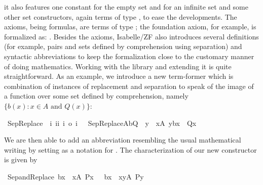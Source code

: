 it also features one constant 
for the empty set and  for an infinite set and some other
set constructors, again terms of type , to ease the
developments. The axioms, being formulas, are terms of type ;
the foundation axiom, for example, is formalized as:
. Besides the axioms, Isabelle/ZF also
introduces several definitions (for example, pairs and sets defined by
comprehension using separation) and syntactic abbreviations to keep
the formalization close to the customary manner of doing mathematics.
Working with the library and extending it is quite
straightforward. 
As an example, we introduce  a new term-former which is combination of
instances of replacement and separation to speak of the image of a function over some set
defined by comprehension, namely $\{b(x): x\in A\text{ and }Q(x)\}$:
\begin{isabelle}
  \isamarkupfalse%
  \ SepReplace\ {\isacharcolon}{\isacharcolon}\
  {\isachardoublequoteopen}{\isacharbrackleft}i{\isacharcomma}\
  i{\isasymRightarrow}i{\isacharcomma}\ i{\isasymRightarrow}\
  o{\isacharbrackright}\
  {\isasymRightarrow}i{\isachardoublequoteclose}\
  \isanewline \ \
  {\isachardoublequoteopen}SepReplace{\isacharparenleft}A{\isacharcomma}b{\isacharcomma}Q{\isacharparenright}\
  {\isacharequal}{\isacharequal}\ {\isacharbraceleft}y\ {\isachardot}\
  x{\isasymin}A{\isacharcomma}\
  y{\isacharequal}b{\isacharparenleft}x{\isacharparenright}\
  {\isasymand}\
  Q{\isacharparenleft}x{\isacharparenright}{\isacharbraceright}{\isachardoublequoteclose}
\end{isabelle}
\noindent %
We are then able to add an abbreviation resembling the usual
mathematical writing by setting 
 as a notation for
\isa{SepReplace{\isacharparenleft}A{\isacharcomma}b{\isacharcomma}Q{\isacharparenright}}. The
characterization of our new constructor is given by
\begin{isabelle}
\isacommand{lemma}\isamarkupfalse%
\ Sep{\isacharunderscore}and{\isacharunderscore}Replace{\isacharcolon}\ {\isachardoublequoteopen}{\isacharbraceleft}b{\isacharparenleft}x{\isacharparenright}\ {\isachardot}{\isachardot}\ x{\isasymin}A{\isacharcomma}\ P{\isacharparenleft}x{\isacharparenright}\ {\isacharbraceright}\ {\isacharequal}\ {\isacharbraceleft}b{\isacharparenleft}x{\isacharparenright}\ {\isachardot}\ x{\isasymin}{\isacharbraceleft}y{\isasymin}A{\isachardot}\ P{\isacharparenleft}y{\isacharparenright}{\isacharbraceright}{\isacharbraceright}{\isachardoublequoteclose}
\end{isabelle}

